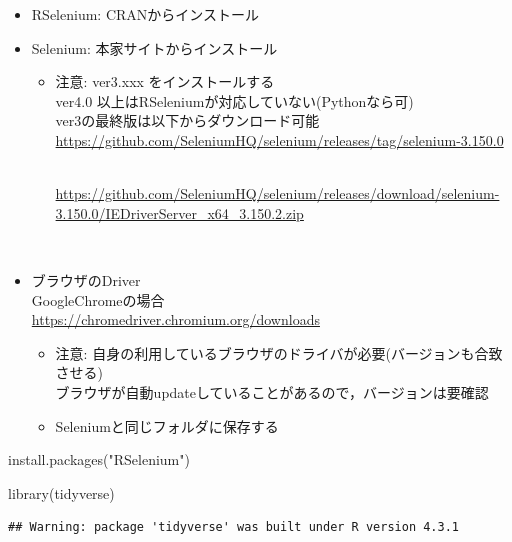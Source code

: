 \documentclass[
]{article}
\newenvironment{Shaded}{\begin{snugshade}}{\end{snugshade}}
\newcommand{\FunctionTok}[1]{\textcolor[rgb]{0.00,0.00,0.00}{#1}}
\newcommand{\NormalTok}[1]{#1}
\newcommand{\StringTok}[1]{\textcolor[rgb]{0.31,0.60,0.02}{#1}}
\providecommand{\tightlist}{%
  \setlength{\itemsep}{0pt}\setlength{\parskip}{0pt}}
\begin{document}
\begin{itemize}
\tightlist
\item
  RSelenium: CRANからインストール\\
\item
  Selenium: 本家サイトからインストール

  \begin{itemize}
  \tightlist
  \item
    注意: ver3.xxx をインストールする\\
    ver4.0 以上はRSeleniumが対応していない(Pythonなら可)\\
    ver3の最終版は以下からダウンロード可能\\
    \url{https://github.com/SeleniumHQ/selenium/releases/tag/selenium-3.150.0}\strut \\
    \url{https://github.com/SeleniumHQ/selenium/releases/download/selenium-3.150.0/IEDriverServer_x64_3.150.2.zip}\strut \\
  \end{itemize}
\item
  ブラウザのDriver\\
  GoogleChromeの場合\\
  \url{https://chromedriver.chromium.org/downloads}

  \begin{itemize}
  \tightlist
  \item
    注意: 自身の利用しているブラウザのドライバが必要(バージョンも合致させる)\\
    ブラウザが自動updateしていることがあるので，バージョンは要確認\\
  \item
    Seleniumと同じフォルダに保存する
  \end{itemize}
\end{itemize}

\begin{Shaded}
\begin{Highlighting}[]
\FunctionTok{install.packages}\NormalTok{(}\StringTok{"RSelenium"}\NormalTok{)}
\end{Highlighting}
\end{Shaded}

\begin{Shaded}
\begin{Highlighting}[]
\FunctionTok{library}\NormalTok{(tidyverse)}
\end{Highlighting}
\end{Shaded}

\begin{verbatim}
## Warning: package 'tidyverse' was built under R version 4.3.1
\end{verbatim}
\end{document}
